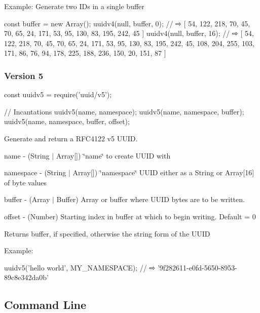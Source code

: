 Example\+: Generate two I\+Ds in a single buffer


\begin{DoxyCode}
const buffer = new Array();
uuidv4(null, buffer, 0);  // ⇨ [ 54, 122, 218, 70, 45, 70, 65, 24, 171, 53, 95, 130, 83, 195, 242, 45 ]
uuidv4(null, buffer, 16); // ⇨ [ 54, 122, 218, 70, 45, 70, 65, 24, 171, 53, 95, 130, 83, 195, 242, 45, 108,
       204, 255, 103, 171, 86, 76, 94, 178, 225, 188, 236, 150, 20, 151, 87 ]
\end{DoxyCode}


\subsubsection*{Version 5}


\begin{DoxyCode}
const uuidv5 = require('uuid/v5');

// Incantations
uuidv5(name, namespace);
uuidv5(name, namespace, buffer);
uuidv5(name, namespace, buffer, offset);
\end{DoxyCode}


Generate and return a R\+F\+C4122 v5 U\+U\+ID.


\begin{DoxyItemize}
\item {\ttfamily name} -\/ (String $\vert$ Array\mbox{[}\mbox{]}) \char`\"{}name\char`\"{} to create U\+U\+ID with
\item {\ttfamily namespace} -\/ (String $\vert$ Array\mbox{[}\mbox{]}) \char`\"{}namespace\char`\"{} U\+U\+ID either as a String or Array\mbox{[}16\mbox{]} of byte values
\item {\ttfamily buffer} -\/ (Array $\vert$ Buffer) Array or buffer where U\+U\+ID bytes are to be written.
\item {\ttfamily offset} -\/ (Number) Starting index in {\ttfamily buffer} at which to begin writing. Default = 0
\end{DoxyItemize}

Returns {\ttfamily buffer}, if specified, otherwise the string form of the U\+U\+ID

Example\+:


\begin{DoxyCode}
uuidv5('hello world', MY\_NAMESPACE);  // ⇨ '9f282611-e0fd-5650-8953-89c8e342da0b'
\end{DoxyCode}


\subsection*{Command Line}

